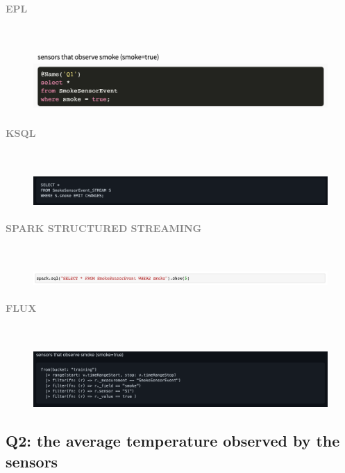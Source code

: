 \documentclass[10pt,a4paper]{article}
\newcommand{\myparagraph}[1]{\paragraph{\normalsize{\textcolor{gray}{\uppercase{\textbf{#1}}}} }\mbox{} \vspace{0.5em}\\}
\begin{document}
\myparagraph{EPL}
\begin{figure}[h!]
 \hfill \includegraphics[width=400pt]{images/epl_Q1}\hspace*{\fill}
\end{figure}
\myparagraph{KSQL}
\begin{figure}[h!]
 \hfill \includegraphics[width=400pt]{images/ksql_Q1}\hspace*{\fill}
\end{figure}
\myparagraph{Spark Structured Streaming}
\begin{figure}[h!]
 \hfill \includegraphics[width=400pt]{images/sss_Q1}\hspace*{\fill}
\end{figure}
\myparagraph{Flux}
\begin{figure}[h!]
 \hfill \includegraphics[width=400pt]{images/flux_Q1}\hspace*{\fill}
\end{figure}

\pagebreak

\subsection{Q2: the average temperature observed by the sensors}
\end{document}
